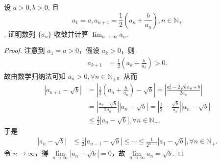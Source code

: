\documentclass[lang=cn,newtx,10pt,scheme=chinese]{../Template/elegantbook}
\begin{document}
\begin{example}
设 $a > 0, b > 0$, 且 \[a_1 = a, a_{n+1} = \frac{1}{2} \left( a_n + \frac{b}{a_n} \right), n \in \mathbb{N}_+\].
证明数列 $\{a_n\}$ 收敛并计算 $\lim_{n \to \infty} a_n$.
\end{example}
\begin{proof}
注意到 $a_1 = a > 0$，假设 $a_k > 0$，则
\begin{align*}
a_{k+1} &= \frac{1}{2} \left( a_k + \frac{b}{a_k} \right) > 0.
\end{align*}
故由数学归纳法可知 $a_n > 0, \forall n \in \mathbb{N}_+$。从而
\begin{align*}
\left| a_{n+1} - \sqrt{b} \right| &= \left| \frac{1}{2} \left( a_n + \frac{b}{a_n} \right) - \sqrt{b} \right| = \left| \frac{a_n^2 - 2\sqrt{b}a_n + b}{2a_n} \right| \\
&= \left| \frac{a_n - \sqrt{b}}{2a_n} \right| \left| a_n - \sqrt{b} \right| = \left| \frac{1}{2} - \frac{\sqrt{b}}{a_n} \right| \left| a_n - \sqrt{b} \right| \\
&\leqslant \frac{1}{2} \left| a_n - \sqrt{b} \right|, \forall n \in \mathbb{N}_+.
\end{align*}
于是
\begin{align*}
\left| a_n - \sqrt{b} \right| &\leqslant \frac{1}{2} \left| a_{n-1} - \sqrt{b} \right| \leqslant \cdots \leqslant \frac{1}{2^{n-1}} \left| a_1 - \sqrt{b} \right|, \forall n \in \mathbb{N}_+.
\end{align*}
令 $n \rightarrow \infty$，得 $\underset{n \to \infty}{\lim} \left| a_n - \sqrt{b} \right| = 0$，故 $\underset{n \to \infty}{\lim} a_n = \sqrt{b}$.
\end{proof}
\end{document}
